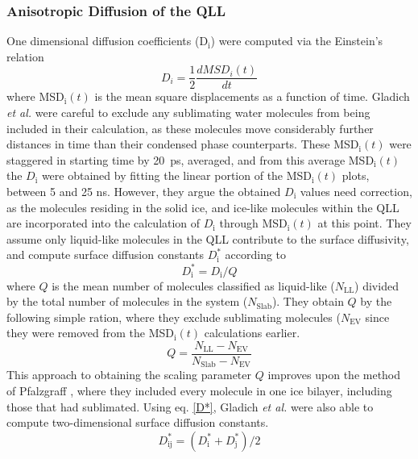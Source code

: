 \subsubsection{Anisotropic Diffusion of the QLL}
One dimensional diffusion coefficients (D$_\mathrm{i}$) were computed
via the Einstein's relation\cite{Allen87}
\begin{equation}
D_{i} = \frac{1}{2} \frac{dMSD_{i}(t)}{dt}
\end{equation}
where MSD$_\mathrm{i}(t)$ is the mean square displacements as a
function of time. Gladich \textit{et al.} were careful to exclude any
sublimating water molecules from being included in their calculation,
as these molecules move considerably further distances in time than
their condensed phase counterparts. These MSD$_\mathrm{i}(t)$ were
staggered in starting time by 20~ps, averaged, and from this average
MSD$_\mathrm{i}(t)$ the $D_\mathrm{i}$ were obtained by fitting the
linear portion of the MSD$_\mathrm{i}(t)$ plots, between 5 and 25
ns. However, they argue the obtained $D_\mathrm{i}$ values need
correction, as the molecules residing in the solid ice, and ice-like
molecules within the QLL are incorporated into the calculation of
$D_\mathrm{i}$ through MSD$_\mathrm{i}(t)$ at this point. They assume
only liquid-like molecules in the QLL contribute to the surface
diffusivity, and compute surface diffusion constants
$D^{*}_\mathrm{i}$ according to\cite{Pfalzgraff11}
\begin{equation}\label{D*}
D^{*}_\mathrm{i} = D_\mathrm{i}/Q
\end{equation}
where $Q$ is the mean number of molecules classified as liquid-like
($N_\mathrm{LL}$) divided by the total number of molecules in the
system ($N_\mathrm{Slab}$). They obtain $Q$ by the following simple
ration, where they exclude sublimating molecules ($N_\mathrm{EV}$
since they were removed from the MSD$_\mathrm{i}(t)$ calculations
earlier.
\begin{equation}
Q = \frac{N_\mathrm{LL} - N_\mathrm{EV}}{N_\mathrm{Slab} -
  N_\mathrm{EV}}
\end{equation}
This approach to obtaining the scaling parameter $Q$ improves upon the
method of Pfalzgraff \cite{Pfalzgraff11}, where they included every
molecule in one ice bilayer, including those that had
sublimated. Using eq. \eqref{D*}, Gladich \textit{et al.} were also
able to compute two-dimensional surface diffusion constants.
\begin{equation}
D^{*}_\mathrm{ij} = (D^{*}_\mathrm{i} + D^{*}_\mathrm{j}) / 2
\end{equation} 

